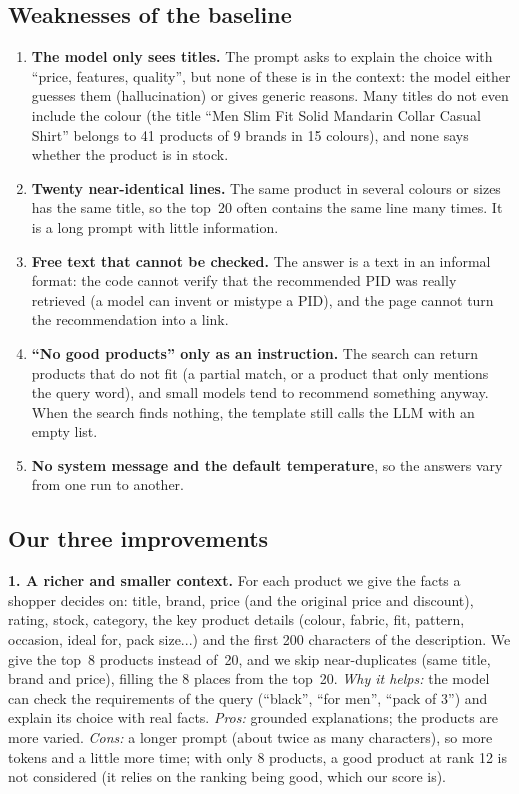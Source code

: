 \documentclass[11pt,a4paper]{article}
\begin{document}
\subsection{Weaknesses of the baseline}
\begin{enumerate}
\item \textbf{The model only sees titles.} The prompt asks to explain the choice with ``price, features, quality'',
but none of these is in the context: the model either guesses them (hallucination) or gives generic reasons. Many titles
do not even include the colour (the title ``Men Slim Fit Solid Mandarin Collar Casual Shirt'' belongs to 41 products of
9 brands in 15 colours), and none says whether the product is in stock.
\item \textbf{Twenty near-identical lines.} The same product in several colours or sizes has the same title, so the
top~20 often contains the same line many times. It is a long prompt with little information.
\item \textbf{Free text that cannot be checked.} The answer is a text in an informal format: the code cannot verify
that the recommended PID was really retrieved (a model can invent or mistype a PID), and the page cannot turn the
recommendation into a link.
\item \textbf{``No good products'' only as an instruction.} The search can return products that do not fit (a
partial match, or a product that only mentions the query word), and small models tend to recommend something anyway.
When the search finds nothing, the template still calls the LLM with an empty list.
\item \textbf{No system message and the default temperature}, so the answers vary from one run to another.
\end{enumerate}

\subsection{Our three improvements}

\textbf{1. A richer and smaller context.} For each product we give the facts a shopper decides on: title, brand,
price (and the original price and discount), rating, stock, category, the key product details (colour, fabric, fit,
pattern, occasion, ideal for, pack size...) and the first 200 characters of the description. We give the top~8
products instead of~20, and we skip near-duplicates (same title, brand and price), filling the 8 places from the
top~20.
\emph{Why it helps:} the model can check the requirements of the query (``black'', ``for men'', ``pack of 3'') and
explain its choice with real facts. \emph{Pros:} grounded explanations; the products are more varied.
\emph{Cons:} a longer prompt (about twice as many characters), so more tokens and a little more time; with only 8
products, a good product at rank 12 is not considered (it relies on the ranking being good, which our score is).
\end{document}
